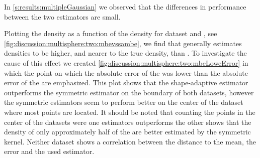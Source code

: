 
	In \cref{s:results:multipleGaussian} we observed that the differences in performance between the two estimators are small. 

	Plotting the \mbe density as a function of the \sambe density for dataset \ferdosiTwo and \baakmanTwo, see \cref{fig:discussion:multisphere:two:mbevssambe}, we find that \sambe generally estimates densities to be higher, and nearer to the true density, than \mbe. To investigate the cause of this effect we created \cref{fig:discussion:multisphere:two:mbeLoweError} in which the point on which the absolute error of the \mbe was lower than the absolute error of the \sambe are emphasized. This plot shows that the shape-adaptive estimator outperforms the symmetric estimator on the boundary of both datasets, however the symmetric estimators seem to perform better on the center of the dataset where most points are located. It should be noted that counting the points in the center of the datasets were one estimators outperforms the other shows that the density of only approximately half of the are better estimated by the symmetric kernel. Neither dataset shows a correlation between the distance to the mean, the error and the used estimator. 

